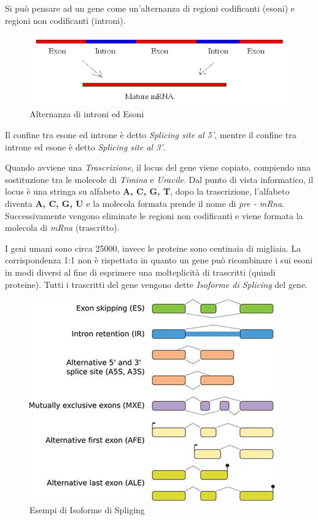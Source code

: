 Si può pensare ad un gene come un'alternanza di regioni codificanti (esoni) e regioni non codificanti (introni).

\begin{figure}[ht]
    \centering
    \includegraphics[scale=0.3]{images/introns - exons.jpg}
    \caption{Alternanza di introni ed Esoni}
    \label{fig:intron-exon}
\end{figure}

Il confine tra esone ed introne è detto \textit{Splicing site al 5'}, mentre il confine tra introne ed esone è detto \textit{Splicing site al 3'}.

Quando avviene una \textit{Trascrizione}, il locus del gene viene copiato, compiendo una sostituzione tra le molecole di \textit{Timina} e \textit{Uracile}. Dal punto di vista informatico, il locus è una stringa su alfabeto \textbf{A, C, G, T}, dopo la trascrizione, l'alfabeto diventa \textbf{A, C, G, U} e la molecola formata prende il nome di \newline \textit{pre - mRna}. Successivamente vengono eliminate le regioni non codificanti e viene formata la molecola di \textit{mRna} (trascritto).


I geni umani sono circa 25000, invece le proteine sono centinaia di migliaia. La corrispondenza 1:1 non è rispettata in quanto un gene può ricombinare i sui esoni in modi diversi al fine di esprimere una molteplicità di trascritti (quindi proteine).
Tutti i trascritti del gene vengono dette \textit{Isoforme di Splicing} del gene.  

\begin{figure}[ht]
    \centering
    \includegraphics[scale=0.6]{images/alternative splicing.jpg}
    \caption{Esempi di Isoforme di Spliging}
    \label{fig:slicing}
\end{figure}

